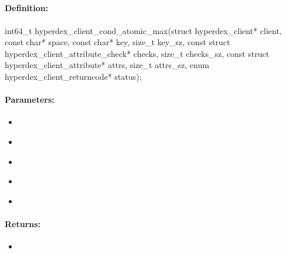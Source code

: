 \pagebreak
\subsection{}
\label{api:c:cond_atomic_max}


\paragraph{Definition:}
\begin{ccode}
int64_t hyperdex_client_cond_atomic_max(struct hyperdex_client* client,
        const char* space,
        const char* key, size_t key_sz,
        const struct hyperdex_client_attribute_check* checks, size_t checks_sz,
        const struct hyperdex_client_attribute* attrs, size_t attrs_sz,
        enum hyperdex_client_returncode* status);
\end{ccode}

\paragraph{Parameters:}
\begin{itemize}[noitemsep]
\item {}\\

\item {}\\

\item {}\\

\item {}\\

\item {}\\

\end{itemize}

\paragraph{Returns:}
\begin{itemize}[noitemsep]
\item {}\\

\end{itemize}


